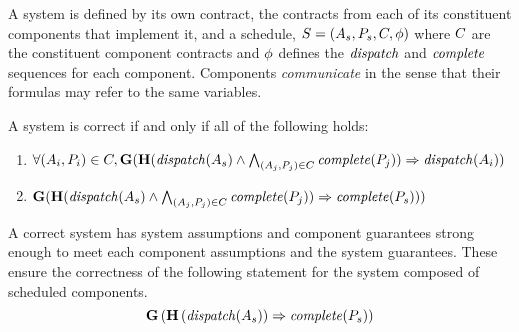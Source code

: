 A system is defined by its own contract, the contracts from each of its constituent components that implement it, and a schedule, $S = (A_s, P_s, C, \phi)$ where $C$ are the constituent component contracts and $\phi$ defines the $\mathit{dispatch}$ and $\mathit{complete}$ sequences for each component.
Components \emph{communicate} in the sense that their formulas may refer to the same variables.


A system is correct if and only if all of the following holds: %
\begin{enumerate}
	 \item $ \forall (A_i, P_i) \in C, \mathbf{G}(\mathbf{H}(\mathit{dispatch}(A_s) \wedge \bigwedge_{(A_j,P_j) \in C} \mathit{complete}(P_j)) \Rightarrow \mathit{dispatch}(A_i)) $
	 \item $ \mathbf{G}(\mathbf{H}(\mathit{dispatch}(A_s) \wedge \bigwedge_{(A_j,P_j) \in C} \mathit{complete}(P_j)) \Rightarrow \mathit{complete}(P_s))) $	
\end{enumerate}

A correct system has system assumptions and component guarantees strong enough to meet each component assumptions and the system guarantees. These ensure the correctness of the following statement for the system composed of scheduled components.
\[
  \mathbf{G}\left(
    \mathbf{H}\left(\mathit{dispatch}(A_s)\right) \Rightarrow \mathit{complete}(P_s) \right)
\]